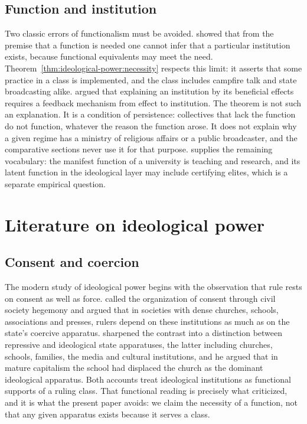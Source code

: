 \documentclass[11pt,letterpaper]{article}
\theoremstyle{definition}
\theoremstyle{remark}
\begin{document}
\subsection{Function and institution}

Two classic errors of functionalism must be avoided. \citet{hempel1959} showed that from the premise that a function is needed one cannot infer that a particular institution exists, because functional equivalents may meet the need. Theorem~\ref{thm:ideological-power:necessity} respects this limit: it asserts that some practice in a class is implemented, and the class includes campfire talk and state broadcasting alike. \citet{elster1983} argued that explaining an institution by its beneficial effects requires a feedback mechanism from effect to institution. The theorem is not such an explanation. It is a condition of persistence: collectives that lack the function do not function, whatever the reason the function arose. It does not explain why a given regime has a ministry of religious affairs or a public broadcaster, and the comparative sections never use it for that purpose. \citet{merton1968} supplies the remaining vocabulary: the manifest function of a university is teaching and research, and its latent function in the ideological layer may include certifying elites, which is a separate empirical question.

\section{Literature on ideological power}
\label{sec:literature}

\subsection{Consent and coercion}

The modern study of ideological power begins with the observation that rule rests on consent as well as force. \citet{gramsci1971} called the organization of consent through civil society hegemony and argued that in societies with dense churches, schools, associations and presses, rulers depend on these institutions as much as on the state's coercive apparatus. \citet{althusser1971} sharpened the contrast into a distinction between repressive and ideological state apparatuses, the latter including churches, schools, families, the media and cultural institutions, and he argued that in mature capitalism the school had displaced the church as the dominant ideological apparatus. Both accounts treat ideological institutions as functional supports of a ruling class. That functional reading is precisely what \citet{elster1983} criticized, and it is what the present paper avoids: we claim the necessity of a function, not that any given apparatus exists because it serves a class.
\end{document}
